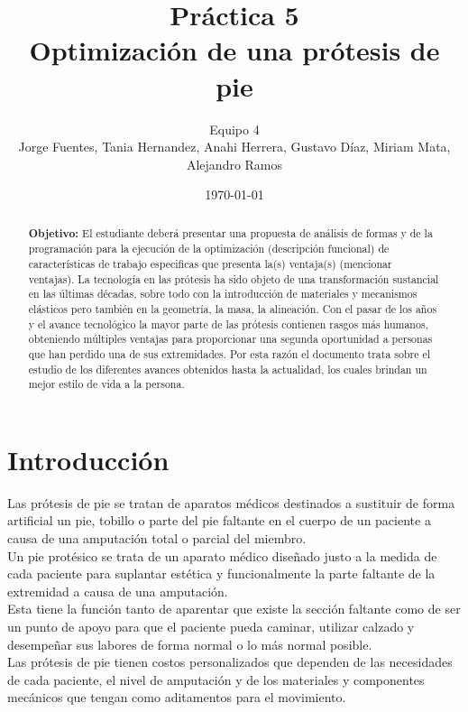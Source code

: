 \documentclass{article}
\author{Equipo 4 \\Jorge  Fuentes, Tania  Hernandez,
 Anahi Herrera, Gustavo  Díaz, Miriam  Mata, Alejandro Ramos} %
\title{Práctica 5 \\ Optimización de una prótesis de pie} %
\date{\today}
\begin{document}
\maketitle %
\begin{abstract} %
\textbf{Objetivo:} El estudiante deberá presentar una propuesta de análisis de formas y de la programación para la ejecución de la optimización (descripción funcional) de características de trabajo especificas que presenta la(s) ventaja(s) (mencionar ventajas). La tecnología en las prótesis ha sido objeto de una transformación sustancial en las últimas décadas, sobre todo con la introducción de materiales y mecanismos elásticos pero también en la geometría, la masa, la alineación. Con el pasar de los años y el avance tecnológico la mayor parte de las prótesis contienen rasgos más humanos, obteniendo múltiples ventajas para proporcionar una segunda oportunidad a personas que han perdido una de sus extremidades. Por esta razón el  documento trata sobre el estudio de los diferentes avances obtenidos hasta la actualidad, los cuales brindan un mejor estilo de vida a la persona.
\end{abstract}
\newpage
\tableofcontents
\newpage
\section{Introducción}\label{intro} %
Las prótesis de pie se tratan de aparatos médicos destinados a sustituir de forma artificial un pie, tobillo o parte del pie faltante en el cuerpo de un paciente a causa de una amputación total o parcial del miembro.\\
Un pie protésico se trata de un aparato médico diseñado justo a la medida de cada paciente para suplantar estética y funcionalmente la parte faltante de la extremidad a causa de una amputación.\\
Esta tiene la función tanto de aparentar que existe la sección faltante como de ser un punto de apoyo para que el paciente pueda caminar, utilizar calzado y desempeñar sus labores de forma normal o lo más normal posible.\\
Las prótesis de pie tienen costos personalizados que dependen de las necesidades de cada paciente, el nivel de amputación y de los materiales y componentes mecánicos que tengan como aditamentos para el movimiento.

\end{document}
